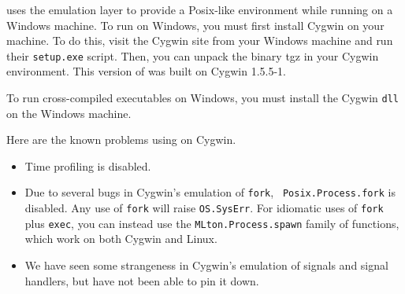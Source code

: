 
{\mlton} uses the 
emulation layer to provide a Posix-like environment while running on a
Windows machine.  To run {\mlton} on Windows, you must first install
Cygwin on your machine.  To do this, visit the Cygwin site from your
Windows machine and run their {\tt setup.exe} script.  Then, you can
unpack the {\mlton} binary tgz in your Cygwin environment.  This
version of {\mlton} was built on Cygwin 1.5.5-1.

To run {\mlton} cross-compiled executables on Windows, you must
install the Cygwin {\tt dll} on the Windows machine.

Here are the known problems using {\mlton} on Cygwin.

\begin{itemize}

\item Time profiling is disabled.

\item Due to several bugs in Cygwin's emulation of {\tt fork}, {\tt
Posix.Process.fork} is disabled.  Any use of {\tt fork} will raise
{\tt OS.SysErr}.  For idiomatic uses of {\tt fork} plus {\tt exec},
you can instead use the {\tt MLton.Process.spawn} family of functions, which
work on both Cygwin and Linux.

\item We have seen some strangeness in Cygwin's emulation of signals and
signal handlers, but have not been able to pin it down.

\end{itemize}
